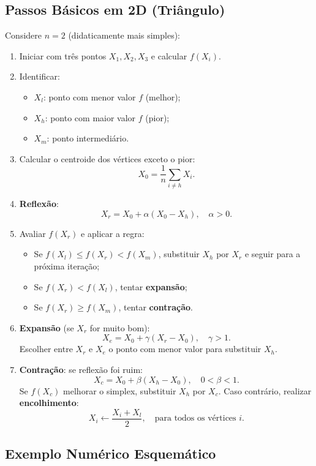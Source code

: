 \documentclass[9pt,a4paper]{extarticle}
\begin{document}
\subsection{Passos Básicos em 2D (Triângulo)}

Considere $n=2$ (didaticamente mais simples):

\begin{enumerate}
    \item Iniciar com três pontos $X_1, X_2, X_3$ e calcular $f(X_i)$.
    \item Identificar:
    \begin{itemize}
        \item $X_l$: ponto com menor valor $f$ (melhor);
        \item $X_h$: ponto com maior valor $f$ (pior);
        \item $X_m$: ponto intermediário.
    \end{itemize}
    \item Calcular o centroide dos vértices exceto o pior:
    \[
        X_0 = \frac{1}{n} \sum_{i \neq h} X_i.
    \]
    \item \textbf{Reflexão}:
    \[
        X_r = X_0 + \alpha (X_0 - X_h),\quad \alpha>0.
    \]
    \item Avaliar $f(X_r)$ e aplicar a regra:
    \begin{itemize}
        \item Se $f(X_l) \le f(X_r) < f(X_m)$, substituir $X_h$ por $X_r$ e seguir para a próxima iteração;
        \item Se $f(X_r) < f(X_l)$, tentar \textbf{expansão};
        \item Se $f(X_r) \ge f(X_m)$, tentar \textbf{contração}.
    \end{itemize}
    \item \textbf{Expansão} (se $X_r$ for muito bom):
    \[
        X_e = X_0 + \gamma (X_r - X_0),\quad \gamma > 1.
    \]
    Escolher entre $X_r$ e $X_e$ o ponto com menor valor para substituir $X_h$.
    \item \textbf{Contração}: se reflexão foi ruim:
    \[
        X_c = X_0 + \beta (X_h - X_0),\quad 0<\beta<1.
    \]
    Se $f(X_c)$ melhorar o simplex, substituir $X_h$ por $X_c$. Caso contrário, realizar \textbf{encolhimento}:
    \[
        X_i \leftarrow \frac{X_i + X_l}{2},\quad \text{para todos os vértices } i.
    \]
\end{enumerate}

\subsection{Exemplo Numérico Esquemático}
\end{document}

